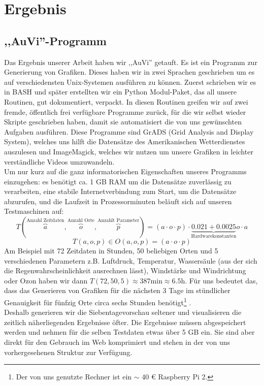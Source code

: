 \documentclass[a4paper,twoside,12pt,titlepage]{article}
\begin{document}
\section{Ergebnis}
\subsection{,,AuVi''-Programm}
Das Ergebnis unserer Arbeit haben wir ,,AuVi'' getauft. Es ist ein Programm zur Generierung von Grafiken. Dieses haben wir in zwei Sprachen geschrieben um es auf verschiedensten Unix-Systemen ausführen zu können. Zuerst schrieben wir es in BASH und später erstellten wir ein Python Modul-Paket, das all unsere Routinen, gut dokumentiert, verpackt. In diesen Routinen greifen wir auf zwei fremde, öffentlich frei verfügbare Programme zurück, für die wir selbst wieder Skripte geschrieben haben, damit sie automatisiert die von uns gewünschten Aufgaben ausführen. Diese Programme sind GrADS (Grid Analysis and Display System), welches uns hilft die Datensätze des Amerikanischen Wetterdienstes auszulesen und ImageMagick, welches wir nutzen um unsere Grafiken in leichter verständliche Videos umzuwandeln.\\
Um nur kurz auf die ganz informatorischen Eigenschaften unseres Programms einzugehen: es benötigt ca. 1 GB RAM um die Datensätze zuverlässig zu verarbeiten, eine stabile Internetverbindung zum Start, um die Datensätze abzurufen, und die Laufzeit in Prozessorminuten beläuft sich auf unseren Testmaschinen auf: $$T(\overbrace{a}^{\text{Anzahl Zeitdaten}},\overbrace{o}^{\text{Anzahl Orte}}, \overbrace{p}^{\text{Anzahlt Parameter}})=(a\cdot o\cdot p)\cdot\underbrace{0.021+0.0025}_{\text{Hardwarekonstanten}}o\cdot a$$ $$T(a,o,p)\in O(a,o,p)=(a\cdot o \cdot p)$$Am Beispiel mit 72 Zeitdaten in Stunden, 50 beliebigen Orten und 5 verschiedenen Parametern z.B. Luftdruck, Temperatur, Wassersäule (aus der sich die Regenwahrscheinlichkeit ausrechnen lässt), Windstärke und Windrichtung oder Ozon haben wir dann $T(72,50,5)\approx 387\text{min}\approx 6.5\text{h}$. Für uns bedeutet das, dass das Generieren von Grafiken für die nächsten 3 Tage im stündlicher Genauigkeit für fünfzig Orte circa sechs Stunden benötigt\footnote{Der von uns genutzte Rechner ist ein $\sim$ 40 \euro$ $ Raspberry Pi 2.} .\\ Deshalb generieren wir die Siebentagevorschau seltener und visualisieren die zeitlich näherliegenden Ergebnisse öfter. Die Ergebnisse müssen abgespeichert werden und nehmen für die selben Testdaten etwas über 5 GB ein. Sie sind aber direkt für den Gebrauch im Web komprimiert und stehen in der von uns vorhergesehenen Struktur zur Verfügung.
\end{document}
